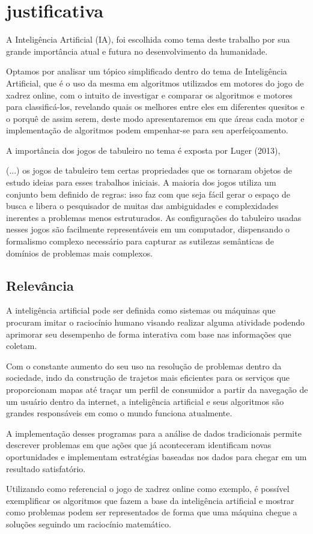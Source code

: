 \chapter{justificativa}

A Inteligência Artificial (IA), foi escolhida como tema deste trabalho por sua grande importância atual e futura no desenvolvimento da humanidade.

Optamos por analisar um tópico simplificado dentro do tema de Inteligência Artificial, que é o uso da mesma em algoritmos utilizados em motores do jogo de xadrez online, com o intuito de investigar e comparar os algoritmos e motores para classificá-los, revelando quais os melhores entre eles em diferentes quesitos e o porquê de assim serem, deste modo apresentaremos em que áreas cada motor e implementação de algoritmos podem empenhar-se para seu aperfeiçoamento.

A importância dos jogos de tabuleiro no tema é exposta por Luger (2013),
\begin{citacao}
    (...) os jogos de tabuleiro tem certas propriedades que os tornaram objetos de estudo ideias para esses trabalhos iniciais.
    A maioria dos jogos utiliza um conjunto bem definido de regras: isso faz com que seja fácil gerar o espaço de busca e
    libera o pesquisador de muitas das ambiguidades e complexidades inerentes a problemas menos estruturados.
    As configurações do tabuleiro usadas nesses jogos são facilmente representáveis em um computador,
    dispensando o formalismo complexo necessário para capturar as sutilezas semânticas de domínios de problemas mais
    complexos. \cite[p.17]{luger}
\end{citacao}

\section{Relevância}
A inteligência artificial pode ser definida como sistemas ou máquinas que procuram imitar o raciocínio humano visando realizar
alguma atividade podendo aprimorar seu desempenho de forma interativa com base nas informações que coletam.

Com o constante aumento do seu uso na resolução de problemas dentro da sociedade, indo da construção de trajetos mais
eficientes para os serviços que proporcionam mapas até traçar um perfil de consumidor a partir da navegação de um usuário
dentro da internet, a inteligência artificial e seus algoritmos são grandes responsáveis em como o mundo funciona atualmente.

A implementação desses programas para a análise de dados tradicionais permite descrever problemas em que ações que já
aconteceram identificam novas oportunidades e implementam estratégias baseadas nos dados para chegar em um resultado
satisfatório.

Utilizando como referencial o jogo de xadrez online como exemplo,  é possível exemplificar os algoritmos que fazem a base da inteligência
artificial e mostrar como problemas podem ser representados de forma que uma máquina chegue a soluções seguindo um raciocínio
matemático.
